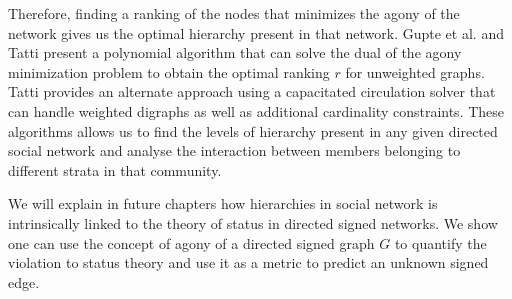Therefore, finding a ranking of the nodes that minimizes the agony of the network gives us the optimal hierarchy present in that network. Gupte et al. \cite{gupte2011finding} and Tatti \cite{tatti2014faster} present a polynomial algorithm that can solve the dual of the agony minimization problem to obtain the optimal ranking $r$ for unweighted graphs. Tatti \cite{tatti2017tiers} provides an alternate approach using a capacitated circulation solver that can handle weighted digraphs as well as additional cardinality constraints. These algorithms allows us to find the levels of hierarchy present in any given directed social network and analyse the interaction between members belonging to different strata in that community.

We will explain in future chapters how hierarchies in social network is intrinsically linked to the theory of status in directed signed networks. We show one can use the concept of agony of a directed signed graph $G$ to quantify the violation to status theory and use it as a metric to predict an unknown signed edge.